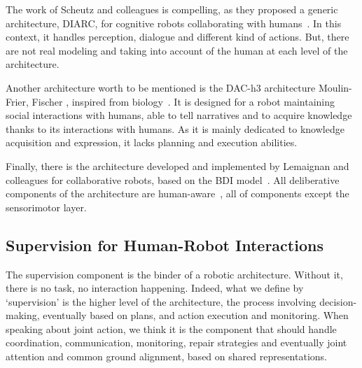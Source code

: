 \documentclass[a4paper,11pt,twoside]{StyleThese}
\begin{document}
The work of Scheutz and colleagues is compelling, as they proposed a generic architecture, DIARC, for cognitive robots collaborating with humans~\cite{scheutz_2006_utility,scheutz_2019_overview}. In this context, it handles perception, dialogue and different kind of actions. But, there are not real modeling and taking into account of the human at each level of the architecture.

Another architecture worth to be mentioned is the DAC-h3 architecture Moulin-Frier, Fischer \etal, inspired from biology~\cite{moulin_2017_dac}. It is designed for a robot maintaining social interactions with humans, able to tell narratives and to acquire knowledge thanks to its interactions with humans. As it is mainly dedicated to knowledge acquisition and expression, it lacks planning and execution abilities.

Finally, there is the architecture developed and implemented by Lemaignan and colleagues for collaborative robots, based on the BDI model~\cite{bratman_1987_intention,bratman_1988_plans}. All deliberative components of the architecture are human-aware~\cite{lemaignan_2017_artificial}, \ie all of components except the sensorimotor layer. 

\subsection{Supervision for Human-Robot Interactions}
The supervision component is the binder of a robotic architecture. Without it, there is no task, no interaction happening. Indeed, what we define by `supervision' is the higher level of the architecture, the process involving decision-making, eventually based on plans, and action execution and monitoring. When speaking about joint action, we think it is the component that should handle coordination, communication, monitoring, repair strategies and eventually joint attention and common ground alignment, based on shared representations.
\end{document}
